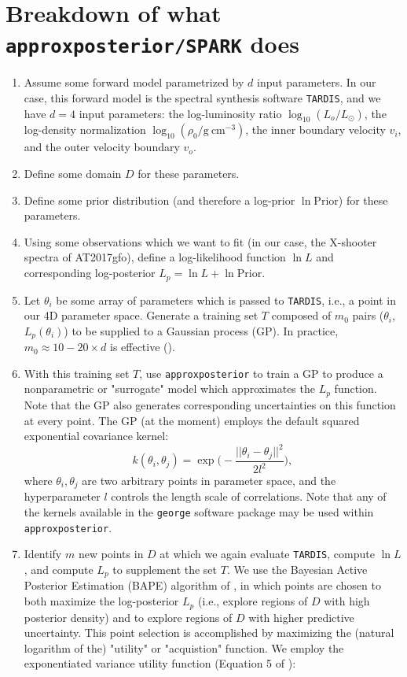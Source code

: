 \documentclass[twocolumn]{aastex63}
\begin{document}
\section{Breakdown of what \texttt{approxposterior/SPARK} does}\label{app:SPARK}
\begin{enumerate}
    \item Assume some forward model parametrized by $d$ input parameters. In our case, this forward model is the spectral synthesis software \texttt{TARDIS}, and we have $d=4$ input parameters: the log-luminosity ratio $\log_{10}(L_o/L_{\odot})$, the log-density normalization $\log_{10}(\rho_0/\mathrm{g~cm^{-3}})$, the inner boundary velocity $v_i$, and the outer velocity boundary $v_o$. 
    \item Define some domain $D$ for these parameters. 
    \item Define some prior distribution (and therefore a log-prior $\ln\mathrm{Prior}$) for these parameters. 
    \item Using some observations which we want to fit (in our case, the X-shooter spectra of AT2017gfo), define a log-likelihood function $\ln L$ and corresponding log-posterior $L_p = \ln L + \ln\mathrm{Prior}$. 
    \item Let $\theta_i$ be some array of parameters which is passed to \texttt{TARDIS}, i.e., a point in our 4D parameter space. Generate a training set $T$ composed of $m_0$ pairs ($\theta_i$, $L_p (\theta_i)$) to be supplied to a Gaussian process (GP). In practice, $m_0 \approx 10-20 \times d$ is effective (\citealt{fleming20}).
    \item With this training set $T$, use \texttt{approxposterior} to train a GP to produce a nonparametric or "surrogate" model which approximates the $L_p$ function. Note that the GP also generates corresponding uncertainties on this function at every point. The GP (at the moment) employs the default squared exponential covariance kernel:
    \begin{equation}
    k(\theta_i, \theta_j) = \exp\Big(-\frac{||\theta_i - \theta_j||^2}{2 l^2}\Big),   
    \end{equation}
    where $\theta_i, \theta_j$ are two arbitrary points in parameter space, and the hyperparameter $l$ controls the length scale of correlations. Note that any of the kernels available in the \texttt{george} software package may be used within \texttt{approxposterior}.
    \item Identify $m$ new points in $D$ at which we again evaluate \texttt{TARDIS}, compute $\ln L$, and compute $L_p$ to supplement the set $T$. We use the Bayesian Active Posterior Estimation (BAPE) algorithm of \cite{kandasamy17}, in which points are chosen to both maximize the log-posterior $L_p$ (i.e., explore regions of $D$ with high posterior density) and to explore regions of $D$ with higher predictive uncertainty. This point selection is accomplished by maximizing the (natural logarithm of the) "utility" or "acquistion" function. We employ the exponentiated variance utility function (Equation 5 of \citealt{kandasamy17}):

\end{enumerate}
\end{document}
